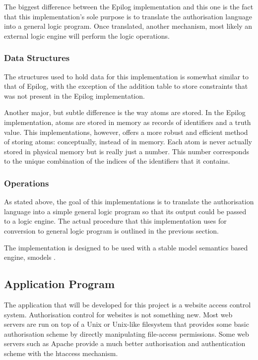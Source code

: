 \documentclass[a4paper,draft]{article}
\begin{document}
      The biggest difference between the Epilog implementation and this one
      is the fact that this implementation's sole purpose is to translate
      the authorisation language into a general logic program. Once translated,
      another mechanism, most likely an external logic engine will perform
      the logic operations.

      \subsubsection{Data Structures}

        The structures used to hold data for this implementation is somewhat
        similar to that of Epilog, with the exception of the addition table
        to store constraints that was not present in the Epilog implementation.

        Another major, but subtle difference is the way atoms are stored. In 
        the Epilog implementation, atoms are stored in memory as records of
        identifiers and a truth value. This implementations, however, offers
        a more robust and efficient method of storing atoms: conceptually,
        instead of in memory. Each atom is never actually stored in physical
        memory but is really just a number. This number corresponds to the
        unique combination of the indices of the identifiers that it contains.

      \subsubsection{Operations}

        As stated above, the goal of this implementations is to translate
        the authorisation language into a simple general logic program
        so that its output could be passed to a logic engine. The actual
        procedure that this implementation uses for conversion to general
        logic program is outlined in the previous section.

        The implementation is designed to be used with a stable model
        semantics based engine, smodels \cite{S}.

    \subsection{Application Program}

      The application that will be developed for this project is a website 
      access control system. Authorisation control for websites is not 
      something new. Most web servers are run on top of a Unix or Unix-like
      filesystem that provides some basic authorisation scheme by directly
      manipulating file-access permissions. Some web servers such as Apache
      provide a much better authorisation and authentication scheme with
      the htaccess mechanism.
\end{document}

